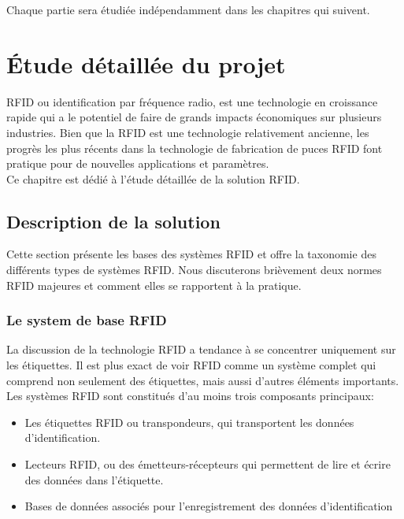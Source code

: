 \documentclass[11pt, a4paper, twoside]{book}
\begin{document}
Chaque partie sera étudiée indépendamment dans les chapitres qui suivent.

\chapter{Étude	détaillée du projet}
RFID ou identification par fréquence radio, est une technologie en croissance rapide qui a le potentiel de faire de grands impacts économiques sur plusieurs industries. Bien que la RFID est une technologie relativement ancienne, les progrès les plus récents dans la technologie de fabrication de puces RFID font pratique pour de nouvelles applications et paramètres.\\
Ce chapitre est dédié à l'étude	 détaillée de la solution RFID.
\section{Description de la solution}
Cette section présente les bases des systèmes RFID et offre la taxonomie des différents types de systèmes RFID. Nous discuterons brièvement deux normes RFID majeures et comment elles se rapportent à la pratique.
\subsection{Le system de base RFID}
La discussion de la technologie RFID a tendance à se concentrer uniquement sur les étiquettes. Il est plus exact de voir RFID comme un système complet qui comprend non seulement des étiquettes, mais aussi d'autres éléments importants. Les systèmes RFID sont constitués d'au moins trois composants principaux:
\begin{itemize}
\item Les étiquettes RFID ou transpondeurs, qui transportent les données d'identification.
\item Lecteurs RFID, ou des émetteurs-récepteurs qui permettent de lire et écrire des données dans l'étiquette.
\item Bases de données associés pour l'enregistrement des données d'identification\\
\end{itemize}
\end{document}
